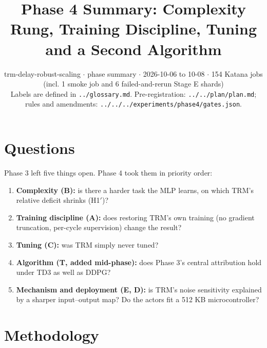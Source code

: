 \documentclass[11pt]{article}
\title{Phase 4 Summary: Complexity Rung, Training Discipline, Tuning and a Second Algorithm}
\author{}
\date{trm-delay-robust-scaling $\cdot$ phase summary $\cdot$ 2026-10-06 to 10-08 $\cdot$ 154 Katana jobs (incl. 1 smoke job and 6 failed-and-rerun Stage E shards)\\[2pt]Labels are defined in \texttt{.\allowbreak{}.\allowbreak{}/\allowbreak{}glossary.\allowbreak{}md}. Pre-registration: \texttt{.\allowbreak{}.\allowbreak{}/\allowbreak{}.\allowbreak{}.\allowbreak{}/\allowbreak{}plan/\allowbreak{}plan.\allowbreak{}md}; rules and amendments: \texttt{.\allowbreak{}.\allowbreak{}/\allowbreak{}.\allowbreak{}.\allowbreak{}/\allowbreak{}.\allowbreak{}.\allowbreak{}/\allowbreak{}experiments/\allowbreak{}phase4/\allowbreak{}gates.\allowbreak{}json}.}
\begin{document}
\maketitle
\section*{Questions}



Phase 3 left five things open. Phase 4 took them in priority order:



\begin{enumerate}
\item \textbf{Complexity (B):} is there a harder task the MLP learns, on which TRM's relative deficit shrinks (H1$'$)?
\item \textbf{Training discipline (A):} does restoring TRM's own training (no gradient truncation, per-cycle supervision) change the result?
\item \textbf{Tuning (C):} was TRM simply never tuned?
\item \textbf{Algorithm (T, added mid-phase):} does Phase 3's central attribution hold under TD3 as well as DDPG?
\item \textbf{Mechanism and deployment (E, D):} is TRM's noise sensitivity explained by a sharper input--output map? Do the actors fit a 512 KB microcontroller?
\end{enumerate}



\section*{Methodology}
\end{document}
